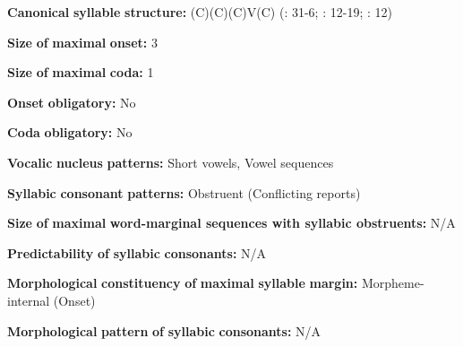\begin{styleBody}
\textbf{Canonical} \textbf{syllable} \textbf{structure:} (C)(C)(C)V(C) (\citealt{Anceaux1965}: 31-6; \citealt{May1997}: 12-19; \citealt{MayMay1981}: 12)
\end{styleBody}

\begin{styleBody}
\textbf{Size} \textbf{of} \textbf{maximal} \textbf{onset:} 3
\end{styleBody}

\begin{styleBody}
\textbf{Size} \textbf{of} \textbf{maximal} \textbf{coda:} 1
\end{styleBody}

\begin{styleBody}
\textbf{Onset} \textbf{obligatory:} No
\end{styleBody}

\begin{styleBody}
\textbf{Coda} \textbf{obligatory:} No
\end{styleBody}

\begin{styleBody}
\textbf{Vocalic} \textbf{nucleus} \textbf{patterns:} Short vowels, Vowel sequences
\end{styleBody}

\begin{styleBody}
\textbf{Syllabic} \textbf{consonant} \textbf{patterns:} Obstruent (Conflicting reports)
\end{styleBody}

\begin{styleBody}
\textbf{Size} \textbf{of} \textbf{maximal} \textbf{word{}-marginal sequences with syllabic obstruents:} N/A
\end{styleBody}

\begin{styleBody}
\textbf{Predictability} \textbf{of} \textbf{syllabic} \textbf{consonants:} N/A
\end{styleBody}

\begin{styleBody}
\textbf{Morphological} \textbf{constituency} \textbf{of} \textbf{maximal} \textbf{syllable} \textbf{margin:} Morpheme-internal (Onset)
\end{styleBody}

\begin{styleBody}
\textbf{Morphological} \textbf{pattern} \textbf{of} \textbf{syllabic} \textbf{consonants:} N/A
\end{styleBody}

